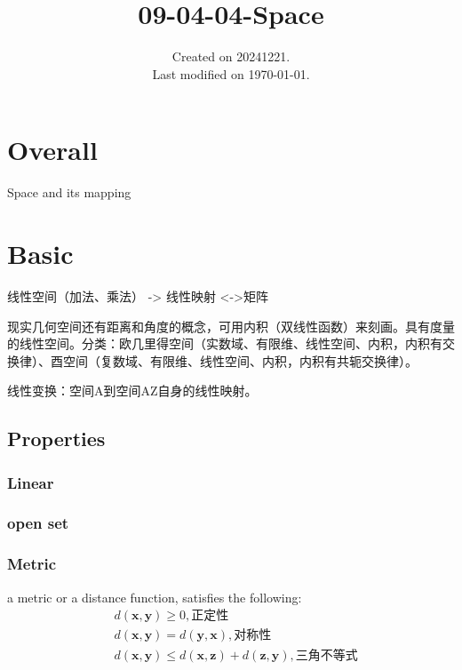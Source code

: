 \documentclass[UTF8]{../../09-Mathematics}
\begin{document}
\title{09-04-04-Space}
\date{Created on 20241221.\\   Last modified on \today.}
\maketitle
\tableofcontents


\chapter{Overall}

 
Space and its mapping



\chapter{Basic}

线性空间（加法、乘法） -> 线性映射 <->矩阵

现实几何空间还有距离和角度的概念，可用内积（双线性函数）来刻画。具有度量的线性空间。分类：欧几里得空间（实数域、有限维、线性空间、内积，内积有交换律）、酉空间（复数域、有限维、线性空间、内积，内积有共轭交换律）。

线性变换：空间A到空间AZ自身的线性映射。


\section{Properties}


\subsection{Linear}

\subsection{open set}

\subsection{Metric}

a metric or a distance function, satisfies the following:
\begin{equation}\label{Defination:Distance_function}
    \begin{split}
    &d(\boldsymbol x, \boldsymbol y) \geqslant 0,正定性\\
    &d(\boldsymbol x, \boldsymbol y) = d(\boldsymbol y, \boldsymbol x),对称性\\
    &d(\boldsymbol x, \boldsymbol y) \leqslant d(\boldsymbol x, \boldsymbol z) + d(\boldsymbol z, \boldsymbol y),三角不等式\\
\end{split}
\end{equation}
\end{document}
